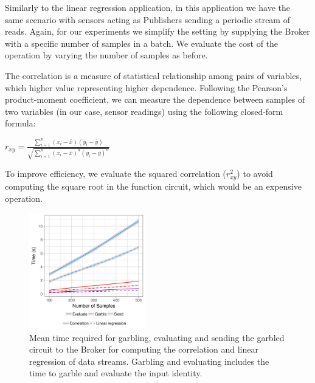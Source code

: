 

Similarly to the linear regression application, in this application we have the
same scenario with sensors acting as Publishers sending a periodic stream of
reads.  Again, for our experiments we simplify the setting by supplying the
Broker with a specific number of samples in a batch.  We evaluate the cost of
the operation by varying the number of samples as before.

The correlation is a measure of statistical relationship among pairs of
variables, which higher value representing higher dependence.  Following the
Pearson's product-moment coefficient, we can measure the dependence between
samples of two variables (in our case, sensor readings) using the following
closed-form formula:

$r_{xy} = \frac{\displaystyle\sum_{i=1}^n (x_i - \bar{x}) (y_i - \bar{y})}
{\sqrt{\displaystyle\sum_{i=1}^n (x_i - \bar{x})^n (y_i - \bar{y})^n}}$

To improve efficiency, we evaluate the squared correlation ($r_{xy}^2$) to avoid
computing the square root in the function circuit, which would be an expensive
operation.

\begin{figure}
  \includegraphics[width=0.45\textwidth]{plots/stream.png}
  \caption{Mean time required for garbling, evaluating and sending the garbled
  circuit to the Broker for computing the correlation and linear regression of
  data streams.  Garbling and evaluating
  includes the time to garble and evaluate the input identity.}
  \label{stream-times}
\end{figure}

